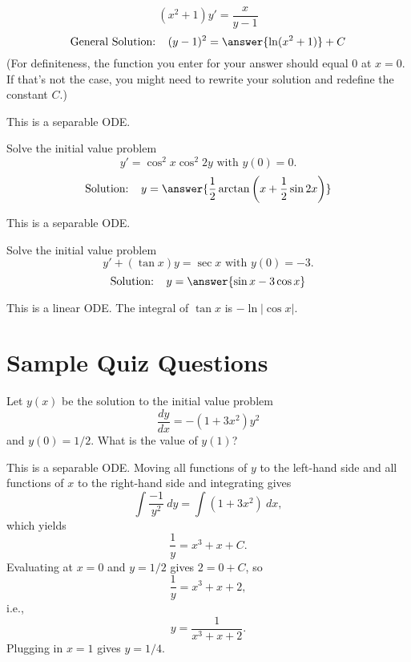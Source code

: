 \documentclass{ximera}
\begin{document}
\begin{exercise}%
\[ (x^2+1) y' = \frac{x}{y-1} \]
\[ \text{General Solution: } \ \  (y-1)^2 = \answer{\ln (x^2 + 1)} + C \]
(For definiteness, the function you enter for your answer should equal $0$ at $x=0$. If that's not the case, you might need to rewrite your solution and redefine the constant $C$.)
\begin{hint}
This is a separable ODE.
\end{hint}
\end{exercise}


\begin{exercise}%
Solve the initial value problem
\[ y' = \cos^2 x \cos^2 2y \text{ with } y(0) = 0. \]
\[ \text{Solution: } \ \ y = \answer{\frac{1}{2} \arctan \left( x + \frac{1}{2} \sin 2x \right)} \]
\begin{hint}
This is a separable ODE.
\end{hint}
\end{exercise}


\begin{exercise}%
Solve the initial value problem
\[  y' + (\tan x) y = \sec x \text{ with } y(0) = -3.\]
\[\text{Solution: } \ \ y = \answer{\sin x - 3\cos x}\]
\begin{hint}
This is a linear ODE. The integral of $\tan x$ is $-\ln |\cos x|$.
\end{hint}
\end{exercise}

\section*{Sample Quiz Questions}

\begin{question}%

Let \(y(x)\) be the solution to the initial value problem \[  \frac{dy}{dx}  = -(1 + 3 x^2)y^2\] and \(y(0) = 1/2\).  What is the value of \(y(1)\)?
\begin{multiplechoice}
\end{multiplechoice}
\begin{feedback}
This is a separable ODE. Moving all functions of \(y\) to the left-hand side and all functions of \(x\) to the right-hand side and integrating gives \[\int  \frac{ -1  }{ y^2} ~ dy = \int (1 + 3 x^2) ~ dx, \] which yields \[\frac{1}{y} = x^3 + x + C.\] Evaluating at \(x = 0\) and \(y = 1/2\) gives \(2 = 0 + C\), so \[\frac{1}{y} = x^3 + x + 2,\] i.e., \[y = \frac{1}{x^3 + x + 2}.\] Plugging in \(x = 1\) gives \(y = 1/4\).
\end{feedback}

\end{question}
\end{document}
